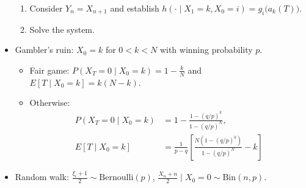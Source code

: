 \documentclass[10pt]{article}
\begin{document}
\begin{multicols*}{2}
\begin{itemize}
\begin{enumerate}
                \item Consider $Y_n = X_{n + 1}$ and establish $h\left(\cdot \mid X_1 = k, X_0 = i\right) = g_i\bigl(a_k\left(T\right)\bigr)$.
                \item Solve the system.
            \end{enumerate}
            \item Gambler's ruin: $X_0 = k$ for $0 < k < N$ with winning probability $p$.
            \begin{itemize}
                \item Fair game: $P\left(X_T = 0 \mid X_0 = k\right) = 1 - \frac{k}{N}$ and $E\left[T \mid X_0 = k\right] = k\left(N - k\right)$.
                \item Otherwise: 
                \begin{align*}
                    P\left(X_T = 0 \mid X_0 = k\right) & = 1 - \frac{1 - \left(q / p\right)^k}{1 - \left(q / p\right)^N}, \\
                    E\left[T \mid X_0 = k\right] & = \frac{1}{p - q}\left[\frac{N\left(1 - \left(q / p\right)^k\right)}{1 - \left(q / p\right)^N} - k\right]
                \end{align*}
            \end{itemize}
            \item Random walk: $\frac{\xi_i + 1}{2} \sim \mathrm{Bernoulli}\left(p\right)$, $\frac{X_n + n}{2} \mid X_0 = 0 \sim \mathrm{Bin}\left(n, p\right)$.
        \end{itemize}
    \end{multicols*}
\end{document}
